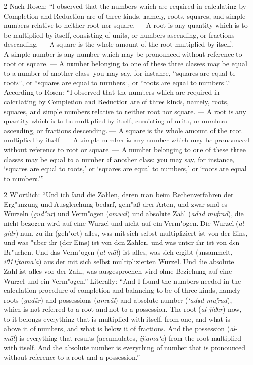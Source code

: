 \documentclass[10pt,a4paper]{article}
\renewcommand{\switchcolumn}{\syncronize\nointerlineskip\columnbreak}
\newcommand{\enquote}[1]{``#1''}
\begin{document}
\begin{paracol}{2}
Nach Rosen: \enquote{I observed that the numbers which are required in calculating by Completion and Reduction are of three kinds, namely, roots, squares, and simple numbers relative to neither root nor square. --- A root is any quantity which is to be multiplied by itself, consisting of units, or numbers ascending, or fractions descending. --- A square is the whole amount of the root multiplied by itself. --- A simple number is any number which may be pronounced without reference to root or square. --- A number belonging to one of these three classes may be equal to a number of another class; you may say, for instance, \enquote{squares are equal to roots}, or \enquote{squares are equal to numbers}, or \enquote{roots are equal to numbers}.}
\switchcolumn
According to Rosen: ``I observed that the numbers which are required in calculating by Completion and Reduction are of three kinds, namely, roots, squares, and simple numbers relative to neither root nor square. --- A root is any quantity which is to be multiplied by itself, consisting of units, or numbers ascending, or fractions descending. --- A square is the whole amount of the root multiplied by itself. --- A simple number is any number which may be pronounced without reference to root or square. --- A number belonging to one of these three classes may be equal to a number of another class; you may say, for instance, `squares are equal to roots,' or `squares are equal to numbers,' or `roots are equal to numbers.'''
\end{paracol}

\begin{paracol}{2}
W"ortlich: \enquote{Und ich fand die Zahlen, deren man beim Rechenverfahren der Erg"anzung und Ausgleichung bedarf, gem"a\ss{} drei Arten, und zwar sind es Wurzeln (\textit{gud"ur}) und Verm"ogen (\textit{amw\=al}) und absolute Zahl (\textit{adad mufrad}), die nicht bezogen wird auf eine Wurzel und nicht auf ein Verm"ogen. Die Wurzel (\textit{al-gidr}) nun, zu ihr (geh"ort) alles, was mit sich selbst multipliziert ist von der Eins, und was "uber ihr (der Eins) ist von den Zahlen, und was unter ihr ist von den Br"uchen. Und das Verm"ogen (\textit{al-m\=al}) ist alles, was sich ergibt (ansammelt, \textit{i\u011ftam\=a'a}) aus der mit sich selbst multiplizierten Wurzel. Und die absolute Zahl ist alles von der Zahl, was ausgesprochen wird ohne Beziehung auf eine Wurzel und ein Verm"ogen.}
\switchcolumn
Literally: ``And I found the numbers needed in the calculation procedure of completion and balancing to be of three kinds, namely roots (\textit{gud\=ur}) and possessions (\textit{amw\=al}) and absolute number (\textit{`adad mufrad}), which is not referred to a root and not to a possession. The root (\textit{al-jidhr}) now, to it belongs everything that is multiplied with itself, from one, and what is above it of numbers, and what is below it of fractions. And the possession (\textit{al-m\=al}) is everything that results (accumulates, \textit{ijtama`a}) from the root multiplied with itself. And the absolute number is everything of number that is pronounced without reference to a root and a possession.''
\end{paracol}
\end{document}
